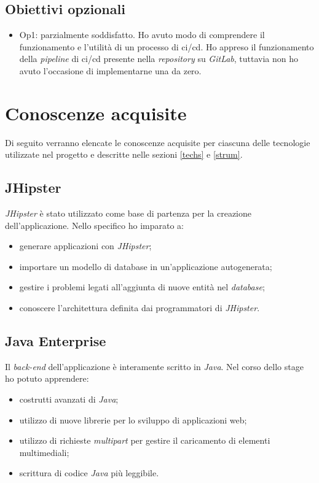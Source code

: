 \subsection{Obiettivi opzionali}
\begin{itemize}
    \item Op1: parzialmente soddisfatto. Ho avuto modo di comprendere il funzionamento e l'utilità di un processo di \gls{ci}/\gls{cd}. Ho appreso il funzionamento della \textit{pipeline} di \gls{ci}/\gls{cd} presente nella \textit{repository} su \textit{GitLab}, tuttavia non ho avuto l'occasione di implementarne una da zero.
\end{itemize}

\section{Conoscenze acquisite}
Di seguito verranno elencate le conoscenze acquisite per ciascuna delle tecnologie utilizzate nel progetto e descritte nelle sezioni \ref{techs} e \ref{strum}.

\subsection{JHipster}
\textit{JHipster} è stato utilizzato come base di partenza per la creazione dell'applicazione. Nello specifico ho imparato a:
\begin{itemize}
    \item generare applicazioni con \textit{JHipster};
    \item importare un modello di database in un'applicazione autogenerata;
    \item gestire i problemi legati all'aggiunta di nuove entità nel \textit{database};
    \item conoscere l'architettura definita dai programmatori di \textit{JHipster}.
\end{itemize}

\subsection{Java Enterprise}
Il \textit{back-end} dell'applicazione è interamente scritto in \textit{Java}. Nel corso dello stage ho potuto apprendere:
\begin{itemize}
    \item costrutti avanzati di \textit{Java};
    \item utilizzo di nuove librerie per lo sviluppo di applicazioni web;
    \item utilizzo di richieste \textit{multipart} per gestire il caricamento di elementi multimediali;
    \item scrittura di codice \textit{Java} più leggibile.
\end{itemize}

